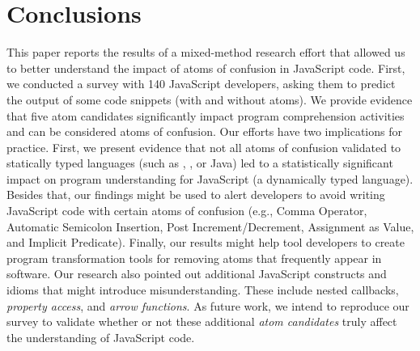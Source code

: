\section{Conclusions}
\label{conclusion}

This paper reports the results of a mixed-method research effort that allowed us to better understand the impact of atoms of confusion in JavaScript code. First, we conducted a survey with 140 JavaScript developers, asking them to predict the output of some code snippets (with and without atoms). We provide evidence that five atom candidates significantly impact program comprehension activities and can be considered atoms of confusion.
Our efforts have two implications for practice. First, we present evidence that not all atoms of confusion validated to statically typed languages (such as \clang, \cpplang, or Java) led to a statistically significant impact on program understanding for JavaScript (a dynamically typed language). Besides that, our findings might be used to alert developers to avoid writing JavaScript code with certain atoms of confusion (e.g., Comma Operator, Automatic Semicolon Insertion, Post Increment/Decrement, Assignment as Value, and Implicit Predicate). Finally, our results might help tool developers to create program transformation tools for removing atoms that frequently appear in software. 
Our research also pointed out additional JavaScript constructs and idioms 
that might introduce misunderstanding. These include nested callbacks, %
\emph{property access}, and \emph{arrow functions}. As future work, we intend to
reproduce our survey to validate whether or not these additional
\emph{atom candidates}
truly affect
the understanding of JavaScript code. 

